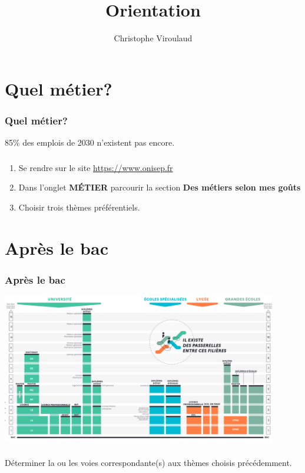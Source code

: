 \documentclass[svgnames,11pt]{beamer}
\author[]{Christophe Viroulaud}
\title{Orientation}
\date{\framebox{\textbf{}}}
\institute{Seconde - SNT}
\begin{document}
\begin{frame}
\titlepage
\end{frame}
\section{Quel métier?}
\begin{frame}
    \frametitle{Quel métier?}
\begin{center}
    {\Large 85\% des emplois de 2030 n'existent pas encore.}
\end{center}
    
\end{frame}
\begin{frame}
    \frametitle{}

    \begin{activite}
    \begin{enumerate}
        \item Se rendre sur le site \url{https://www.onisep.fr}
        \item Dans l'onglet \textbf{MÉTIER} parcourir la section \textbf{Des métiers selon mes goûts}
        \item Choisir trois thèmes préférentiels.
    \end{enumerate}
    \end{activite}

\end{frame}
\section{Après le bac}
\begin{frame}
    \frametitle{Après le bac}

    \begin{center}
    \centering
    \includegraphics[width=12cm]{ressources/postbac.png}
    \end{center}

\end{frame}
\begin{frame}
    \frametitle{}

    \begin{activite}
    Déterminer la ou les voies correspondante(s) aux thèmes choisis précédemment. 
    \end{activite}

\end{frame}
\end{document}
